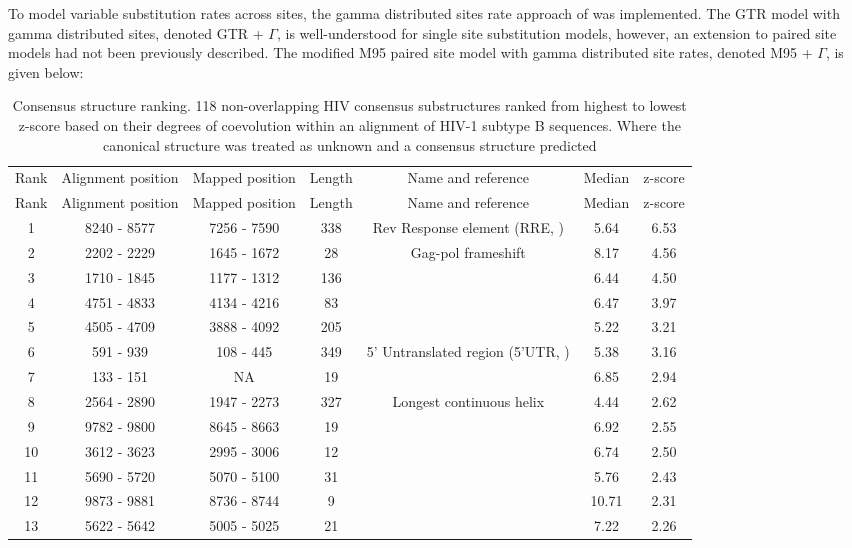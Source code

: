 \documentclass[]{article}
\begin{document}
To model variable substitution rates across sites, the gamma distributed sites rate approach of \citep{yang1993maximum, yang1994maximum} was implemented. The GTR model with gamma distributed sites, denoted GTR + $\Gamma$, is well-understood for single site substitution models, however, an extension to paired site models had not been previously described. The modified M95 paired site model with gamma distributed site rates, denoted M95 + $\Gamma$, is given below:

\begin{landscape}
	\small
	\begin{longtable}{ccccccc}
		\captionsetup{justification=centering}
		\caption{\label{tab:rankingconsensus} Consensus structure ranking. 118 non-overlapping HIV consensus substructures ranked from highest to lowest z-score based on their degrees of coevolution within an alignment of HIV-1 subtype B sequences. Where the canonical structure was treated as unknown and a consensus structure predicted}\\
		\toprule
		Rank & Alignment position  & Mapped position & Length & Name and reference & Median & z-score\\	
		\midrule
		\endfirsthead
		\toprule
		Rank & Alignment position  & Mapped position & Length & Name and reference & Median & z-score\\
		\midrule
		\endhead
		\rowcolor{black!20} 1 & 8240 - 8577 & 7256 - 7590 & 338 & Rev Response element (RRE, \citet{heaphy1990hiv, mandal2004gene}) & 5.64 & 6.53\tabularnewline
		2 & 2202 - 2229 & 1645 - 1672 & 28 & Gag-pol frameshift \citep{chamorro1992rna} & 8.17 & 4.56\tabularnewline
		\rowcolor{black!20} 3 & 1710 - 1845 & 1177 - 1312 & 136 &  & 6.44 & 4.50\tabularnewline
		4 & 4751 - 4833 & 4134 - 4216 & 83 &  & 6.47 & 3.97\tabularnewline
		\rowcolor{black!20} 5 & 4505 - 4709 & 3888 - 4092 & 205 &  & 5.22 & 3.21\tabularnewline
		6 & 591 - 939 & 108 - 445 & 349 & 5' Untranslated region (5'UTR, \citet{siegfried2014rna}) & 5.38 & 3.16\tabularnewline
		\rowcolor{black!20} 7 & 133 - 151 & NA & 19 &  & 6.85 & 2.94\tabularnewline
		8 & 2564 - 2890 & 1947 - 2273 & 327 & Longest continuous helix \citep{siegfried2014rna} & 4.44 & 2.62\tabularnewline
		\rowcolor{black!20} 9 & 9782 - 9800 & 8645 - 8663 & 19 &  & 6.92 & 2.55\tabularnewline
		10 & 3612 - 3623 & 2995 - 3006 & 12 &  & 6.74 & 2.50\tabularnewline
		\rowcolor{black!20} 11 & 5690 - 5720 & 5070 - 5100 & 31 &  & 5.76 & 2.43\tabularnewline
		12 & 9873 - 9881 & 8736 - 8744 & 9 &  & 10.71 & 2.31\tabularnewline
		\rowcolor{black!20} 13 & 5622 - 5642 & 5005 - 5025 & 21 &  & 7.22 & 2.26\tabularnewline

\end{longtable}
\end{landscape}
\end{document}
